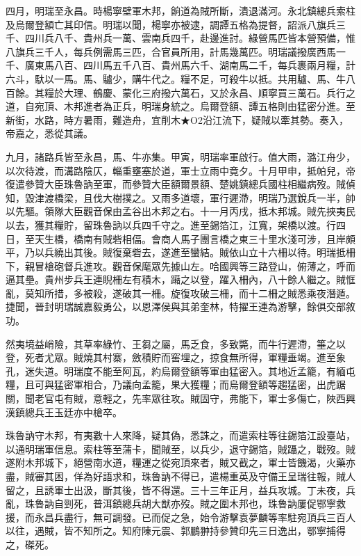 \begin{pinyinscope}
四月，明瑞至永昌。時楊寧壁軍木邦，餉道為賊所斷，潰退滿河。永北鎮總兵索柱及烏爾登額亡其印信。明瑞以聞，楊寧亦被逮，調譚五格為提督，詔派八旗兵三千、四川兵八千、貴州兵一萬、雲南兵四千，赴邊進討。綠營馬匹皆本營預備，惟八旗兵三千人，每兵例需馬三匹，合官員所用，計馬幾萬匹。明瑞議撥廣西馬一千、廣東馬八百、四川馬五千八百、貴州馬六千、湖南馬二千，每兵裹兩月糧，計六斗，馱以一馬。馬、驢少，購牛代之。糧不足，可殺牛以抵。共用驢、馬、牛八百餘。其糧於大理、鶴慶、蒙化三府撥六萬石，又於永昌、順寧買三萬石。兵行之道，自宛頂、木邦進者為正兵，明瑞身統之。烏爾登額、譚五格則由猛密分進。至新街，水路，時方暑雨，難造舟，宜削木★O2沿江流下，疑賊以牽其勢。奏入，帝嘉之，悉從其議。

九月，諸路兵皆至永昌，馬、牛亦集。甲寅，明瑞率軍啟行。值大雨，潞江舟少，以次待渡，而溝路陰仄，輜重壅塞於道，軍士立雨中竟夕。十月甲申，抵帕兒，帝復遣參贊大臣珠魯訥至軍，而參贊大臣額爾景額、楚姚鎮總兵國柱相繼病歿。賊偵知，毀津渡橋梁，且伐大樹撲之。又雨多道壞，軍行遲滯，明瑞乃選銳兵一半，帥以先驅。領隊大臣觀音保由孟谷出木邦之右。十一月丙戌，抵木邦城。賊先挾夷民以去，獲其糧貯，留珠魯訥以兵四千守之。進至錫箔江，江寬，架橋以渡。行四日，至天生橋，橋南有賊砦相偪。會商人馬子團言橋之東三十里水淺可涉，且岸頗平，乃以兵繞出其後。賊復棄砦去，遂進至蠻結。賊依山立十六柵以待。明瑞抵柵下，親冒槍砲督兵進攻。觀音保麾眾先據山左。哈國興等三路登山，俯薄之，呼而逼其壘。貴州步兵王連睨柵左有積木，躤之以登，躍入柵內，八十餘人繼之。賊恇亂，莫知所措，多被殺，遂破其一柵。旋復攻破三柵，而十二柵之賊悉乘夜潛遁。捷聞，晉封明瑞誠嘉毅勇公，以恩澤侯與其弟奎林，特擢王連為游擊，餘俱交部敘功。

然夷境益峭險，其草率綠竹、王芻之屬，馬乏食，多致斃，而牛行遲滯，箠之以登，死者尤眾。賊燒其村寨，斂積貯而窖埋之，掠食無所得，軍糧垂竭。進至象孔，迷失道。明瑞度不能至阿瓦，約烏爾登額等軍由猛密入。其地近孟籠，有緬屯糧，且可與猛密軍相合，乃議向孟籠，果大獲糧；而烏爾登額等趨猛密，出虎踞關，聞老官屯有賊，意輕之，先率眾往攻。賊固守，弗能下，軍士多傷亡，陜西興漢鎮總兵王玉廷亦中槍卒。

珠魯訥守木邦，有夷數十人來降，疑其偽，悉誅之，而遣索柱等往錫箔江設臺站，以通明瑞軍信息。索柱等至蒲卡，聞賊至，以兵少，退守錫箔，賊躡之，戰歿。賊遂附木邦城下，絕營南水道，糧運之從宛頂來者，賊又截之，軍士皆饑渴，火藥亦盡，賊審其困，佯為好語求和，珠魯訥不得已，遣楊重英及守備王呈瑞往報，賊人留之，且誘軍士出汲，斷其後，皆不得還。三十三年正月，益兵攻城。丁未夜，兵亂，珠魯訥自剄死，普洱鎮總兵胡大猷亦歿。賊之圍木邦也，珠魯訥屢促鄂寧救援，而永昌兵盡行，無可調發。已而促之急，始令游擊袁夢麟等率駐宛頂兵三百人以往，遇賊，皆不知所之。知府陳元震、郭鵬翀持參贊印先三日逸出，鄂寧捕得之，磔死。


\end{pinyinscope}
